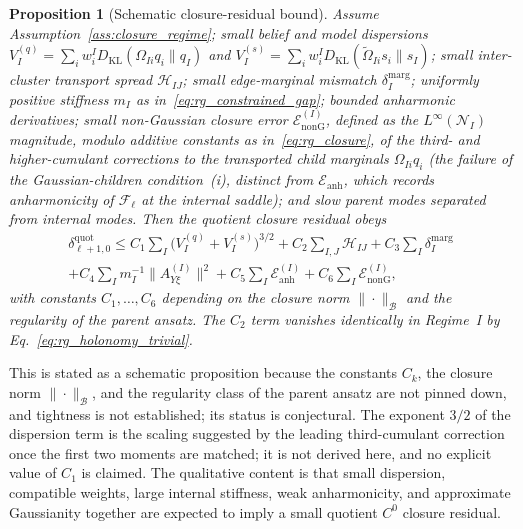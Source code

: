 \documentclass[11pt]{article}
\newtheorem{proposition}{Proposition}
\begin{document}
\begin{proposition}[Schematic closure-residual bound]
\label{thm:rg_residual}
Assume Assumption~\ref{ass:closure_regime}; small belief and model dispersions $V_I^{(q)} = \sum_i w_i^I D_{\mathrm{KL}}(\Omega_{Ii}q_i \| q_I)$ and $V_I^{(s)} = \sum_i w_i^I D_{\mathrm{KL}}(\widetilde{\Omega}_{Ii}s_i \| s_I)$; small inter-cluster transport spread $\mathcal{H}_{IJ}$; small edge-marginal mismatch $\delta_I^{\mathrm{marg}}$; uniformly positive stiffness $m_I$ as in~\eqref{eq:rg_constrained_gap}; bounded anharmonic derivatives; small non-Gaussian closure error $\mathcal{E}_{\mathrm{nonG}}^{(I)}$, defined as the $L^\infty(\mathcal{N}_I)$ magnitude, modulo additive constants as in~\eqref{eq:rg_closure}, of the third- and higher-cumulant corrections to the transported child marginals $\Omega_{Ii}q_i$ (the failure of the Gaussian-children condition~(i), distinct from $\mathcal{E}_{\mathrm{anh}}$, which records anharmonicity of $\mathcal{F}_\ell$ at the internal saddle); and slow parent modes separated from internal modes. Then the quotient closure residual obeys
\begin{multline}
\delta_{\ell+1,0}^{\mathrm{quot}} \le C_1\sum_I \big(V_I^{(q)} + V_I^{(s)}\big)^{3/2} + C_2\sum_{I,J}\mathcal{H}_{IJ} + C_3\sum_I \delta_I^{\mathrm{marg}} \\
 + C_4\sum_I m_I^{-1}\|A_{Y\xi}^{(I)}\|^2 + C_5\sum_I \mathcal{E}_{\mathrm{anh}}^{(I)} + C_6\sum_I \mathcal{E}_{\mathrm{nonG}}^{(I)},
\end{multline}
with constants $C_1, \ldots, C_6$ depending on the closure norm $\|\cdot\|_\mathcal{B}$ and the regularity of the parent ansatz. The $C_2$ term vanishes identically in Regime~I by Eq.~\eqref{eq:rg_holonomy_trivial}.
\end{proposition}

This is stated as a schematic proposition because the constants $C_k$, the closure norm $\|\cdot\|_\mathcal{B}$, and the regularity class of the parent ansatz are not pinned down, and tightness is not established; its status is conjectural. The exponent $3/2$ of the dispersion term is the scaling suggested by the leading third-cumulant correction once the first two moments are matched; it is not derived here, and no explicit value of $C_1$ is claimed. The qualitative content is that small dispersion, compatible weights, large internal stiffness, weak anharmonicity, and approximate Gaussianity together are expected to imply a small quotient $C^0$ closure residual.
\end{document}
